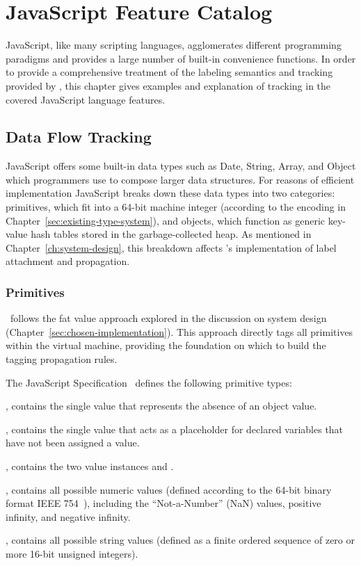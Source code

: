
\chapter{JavaScript Feature Catalog}

JavaScript, like many scripting languages, agglomerates different programming paradigms and provides a large number of built-in convenience functions.
In order to provide a comprehensive treatment of the labeling semantics and tracking provided by \FlowCore, this chapter gives examples and explanation of tracking in the covered JavaScript language features.

\section{Data Flow Tracking}

JavaScript offers some built-in data types such as Date, String, Array, and Object which programmers use to compose larger data structures.
For reasons of efficient implementation JavaScript breaks down these data types into two categories: primitives, which fit into a 64-bit machine integer (according to the encoding in Chapter~\ref{sec:existing-type-system}), and objects, which function as generic key-value hash tables stored in the garbage-collected heap.
As mentioned in Chapter~\ref{ch:system-design}, this breakdown affects \FlowCore's implementation of label attachment and propagation.

\subsection{Primitives}

\FlowCore\ follows the fat value approach explored in the discussion on system design (Chapter~\ref{sec:chosen-implementation}).
This approach directly tags all primitives within the virtual machine, providing the foundation on which to build the tagging propagation rules.

The JavaScript Specification~\cite{ecma} defines the following primitive types:
\begin{description}
  \item \textbf{}, contains the single value  that represents the absence of an object value.
  \item \textbf{}, contains the single value  that acts as a placeholder for declared variables that have not been assigned a value.
  \item \textbf{}, contains the two value instances  and .
  \item \textbf{}, contains all possible numeric values (defined according to the 64-bit binary format IEEE 754~\cite{ieee754}), including the ``Not-a-Number'' (NaN) values, positive infinity, and negative infinity.
  \item \textbf{}, contains all possible string values (defined as a finite ordered sequence of zero or more 16-bit unsigned integers).
\end{description}

